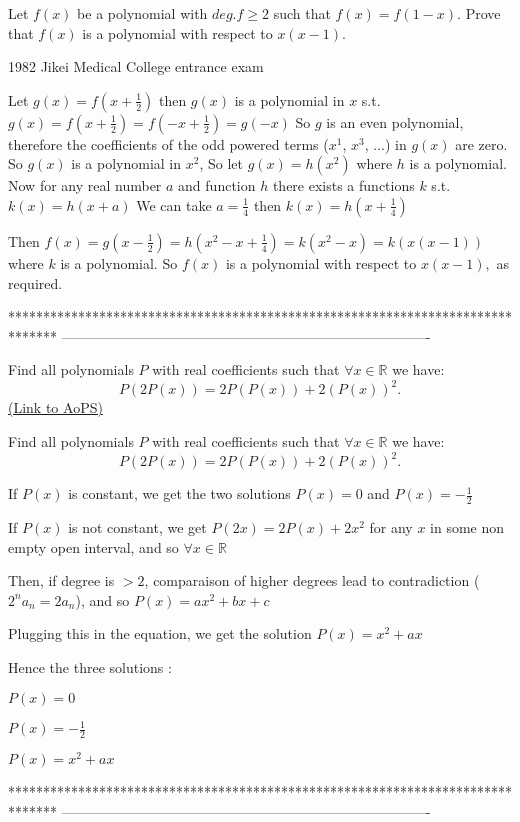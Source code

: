 \begin{solution}
	\begin{tcolorbox}Let $f(x)$ be a polynomial with $deg.f\geq 2$ such that $f(x)=f(1-x).$
Prove that $f(x)$ is a polynomial with respect to $x(x-1).$

\begin{italicized}1982 Jikei Medical College entrance exam\end{italicized}\end{tcolorbox}
Let $g(x)=f(x+\frac{1}{2})$ then $g(x)$ is a polynomial in $x$ s.t. $g(x)=f(x+\frac{1}{2})=f(-x+\frac{1}{2})=g(-x)$
So $g$ is an even polynomial, therefore the coefficients of the odd powered terms ($x^1$, $x^3$, ...) in $g(x)$ are zero.
So $g(x)$ is a polynomial in $x^2$,
So let $g(x)=h(x^2)$ where $h$ is a polynomial.
Now for any real number $a$ and function $h$ there exists a functions $k$ s.t. $k(x)=h(x+a)$
We can take $a=\frac{1}{4}$ then $k(x)=h(x+\frac{1}{4})$

Then $f(x)=g(x-\frac{1}{2})=h(x^2-x+\frac{1}{4})=k(x^2-x)=k(x(x-1))$ where $k$ is a polynomial.
So $f(x)$ is a polynomial with respect to $x(x-1),$ as required.
\end{solution}
*******************************************************************************
-------------------------------------------------------------------------------

\begin{problem}
	Find all polynomials $P$ with real coefficients such that $\forall{x\in\mathbb{R}}$ we have:
\[ P(2P(x))=2P(P(x))+2(P(x))^2. \]
	\flushright \href{https://artofproblemsolving.com/community/c6h369944}{(Link to AoPS)}
\end{problem}



\begin{solution}
	\begin{tcolorbox}Find all polynomials $P$ with real coefficients such that $\forall{x\in\mathbb{R}}$ we have:
\[ P(2P(x))=2P(P(x))+2(P(x))^2. \]\end{tcolorbox}
If $P(x)$ is constant, we get the two solutions $P(x)=0$ and $P(x)=-\frac 12$

If $P(x)$ is not constant, we get $P(2x)=2P(x)+2x^2$ for any $x$ in some non empty open interval, and so $\forall x\in\mathbb R$

Then, if degree is $>2$, comparaison of higher degrees lead to contradiction ($2^na_n=2a_n$), and so $P(x)=ax^2+bx+c$

Plugging this in the equation, we get the solution $P(x)=x^2+ax$

Hence the three solutions :

$P(x)=0$

$P(x)=-\frac 12$

$P(x)=x^2+ax$
\end{solution}
*******************************************************************************
-------------------------------------------------------------------------------

